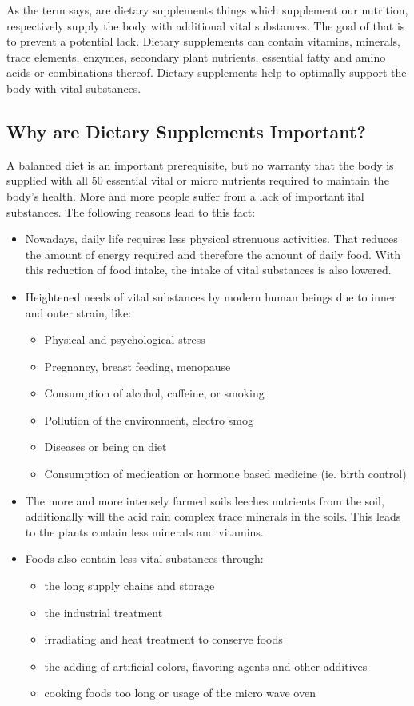 \documentclass[../main.tex]{subfiles}
\begin{document}
As the term says, are dietary supplements things which supplement our nutrition,
respectively supply the body with additional vital substances.
The goal of that is to prevent a potential lack.
Dietary supplements can contain vitamins, minerals, trace elements, enzymes, secondary plant nutrients,
essential fatty and amino acids or combinations thereof.
Dietary supplements help to optimally support the body with vital substances.

\subsection{Why are Dietary Supplements Important?}
A balanced diet is an important prerequisite, but no warranty that the body is supplied with all 50
essential vital or micro nutrients required to maintain the body's health.
More and more people suffer from a lack of important ital substances.
The following reasons lead to this fact:

\renewcommand{\labelitemii}{$\star$}
\begin{itemize}
\item Nowadays, daily life requires less physical strenuous activities.
  That reduces the amount of energy required and therefore the amount of daily food.
  With this reduction of food intake, the intake of vital substances is also lowered.
\item Heightened needs of vital substances by modern human beings due to inner and outer strain, like:
  \begin{itemize}
  \item Physical and psychological stress
  \item Pregnancy, breast feeding, menopause
  \item Consumption of alcohol, caffeine, or smoking
  \item Pollution of the environment, electro smog
  \item Diseases or being on diet
    \item Consumption of medication or hormone based medicine (ie. birth control)
    \end{itemize}
  \item The more and more intensely farmed soils leeches nutrients from the soil,
    additionally will the acid rain complex trace minerals in the soils.
    This leads to the plants contain less minerals and vitamins.
  \item Foods also contain less vital substances through:
    \begin{itemize}
    \item the long supply chains and storage
    \item the industrial treatment
    \item irradiating and heat treatment to conserve foods
    \item the adding of artificial colors, flavoring agents and other additives
      \item cooking foods too long or usage of the micro wave oven
    \end{itemize}
  \end{itemize}
\end{document}
